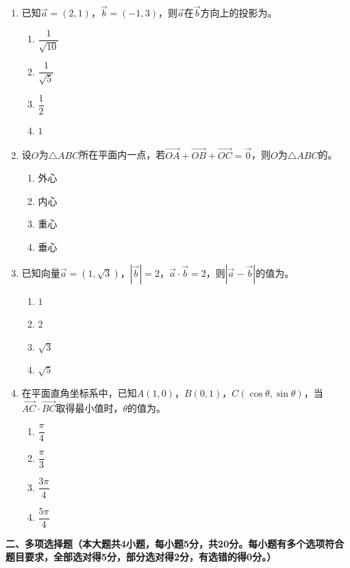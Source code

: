 \documentclass[12pt, a4paper]{ctexart}
\newcommand{\blank}[1]{\underline{\hspace{#1}}}
\begin{document}
\begin{enumerate}
\item 已知$\vec{a}=(2,1)$，$\vec{b}=(-1,3)$，则$\vec{a}$在$\vec{b}$方向上的投影为\blank{3cm}。
\begin{enumerate}[label=\Alph*.]
\item $\dfrac{1}{\sqrt{10}}$
\item $\dfrac{1}{\sqrt{5}}$
\item $\dfrac{1}{2}$
\item $1$
\end{enumerate}

\item 设$O$为$\triangle ABC$所在平面内一点，若$\overrightarrow{OA}+\overrightarrow{OB}+\overrightarrow{OC}=\vec{0}$，则$O$为$\triangle ABC$的\blank{3cm}。
\begin{enumerate}[label=\Alph*.]
\item 外心
\item 内心
\item 重心
\item 垂心
\end{enumerate}

\item 已知向量$\vec{a}=(1,\sqrt{3})$，$|\vec{b}|=2$，$\vec{a}\cdot\vec{b}=2$，则$|\vec{a}-\vec{b}|$的值为\blank{3cm}。
\begin{enumerate}[label=\Alph*.]
\item $1$
\item $2$
\item $\sqrt{3}$
\item $\sqrt{5}$
\end{enumerate}

\item 在平面直角坐标系中，已知$A(1,0)$，$B(0,1)$，$C(\cos\theta,\sin\theta)$，当$\overrightarrow{AC}\cdot\overrightarrow{BC}$取得最小值时，$\theta$的值为\blank{3cm}。
\begin{enumerate}[label=\Alph*.]
\item $\dfrac{\pi}{4}$
\item $\dfrac{\pi}{3}$
\item $\dfrac{3\pi}{4}$
\item $\dfrac{5\pi}{4}$
\end{enumerate}
\end{enumerate}

\vspace{1em}

\noindent\textbf{二、多项选择题（本大题共4小题，每小题5分，共20分。每小题有多个选项符合题目要求，全部选对得5分，部分选对得2分，有选错的得0分。）}
\end{document}

